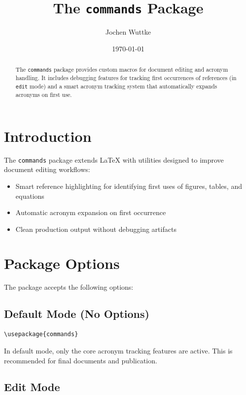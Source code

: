 \documentclass[11pt]{article}
\title{The \texttt{commands} Package}
\author{Jochen Wuttke}
\date{\today}
\begin{document}
\maketitle

\begin{abstract}
The \texttt{commands} package provides custom macros for document editing and acronym handling. 
It includes debugging features for tracking first occurrences of references (in \texttt{edit} mode) 
and a smart acronym tracking system that automatically expands acronyms on first use.
\end{abstract}

\tableofcontents

\section{Introduction}

The \texttt{commands} package extends \LaTeX{} with utilities designed to improve document editing workflows:
\begin{itemize}
  \item Smart reference highlighting for identifying first uses of figures, tables, and equations
  \item Automatic acronym expansion on first occurrence
  \item Clean production output without debugging artifacts
\end{itemize}

\section{Package Options}

The package accepts the following options:

\subsection{Default Mode (No Options)}

\begin{verbatim}
\usepackage{commands}
\end{verbatim}

In default mode, only the core acronym tracking features are active. 
This is recommended for final documents and publication.

\subsection{Edit Mode}
\end{document}
